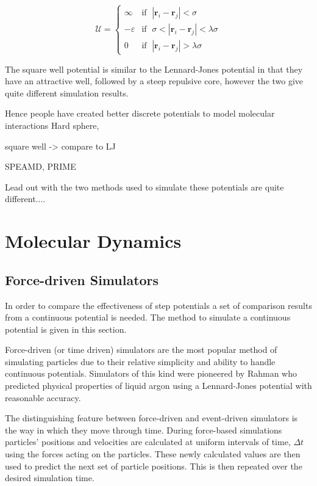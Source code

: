 \documentclass[12pt]{UoAthesis}
\begin{document}
\begin{equation}
  \label{eq:potentialSW}
  \mathcal{U} = 
  \begin{cases}
    \infty &\text{if }\; |\mathbf{r}_i - \mathbf{r}_j| < \sigma \\
    -\varepsilon &\text{if }\; \sigma < |\mathbf{r}_i - \mathbf{r}_j| < \lambda\sigma \\
    0 &\text{if }\; |\mathbf{r}_i - \mathbf{r}_j| > \lambda\sigma
  \end{cases}
\end{equation}

The square well potential is similar to the Lennard-Jones potential in
that they have an attractive well, followed by a steep repulsive core,
however the two give quite different simulation results.  


Hence people have created better discrete potentials to model molecular interactions
 Hard sphere,

square well -> compare to LJ

SPEAMD, PRIME

Lead out with the two methods used to simulate these potentials are quite different....




\chapter{Molecular Dynamics}

\section{Force-driven Simulators} 
In order to compare the effectiveness of step potentials a set of
comparison results from a continuous potential is needed.  The method
to simulate a continuous potential is given in this section.

Force-driven (or time driven) simulators are the most popular method
of simulating particles due to their relative simplicity and ability
to handle continuous potentials. Simulators of this kind were
pioneered by Rahman \cite{Rahman1964} who predicted physical
properties of liquid argon using a Lennard-Jones potential with
reasonable accuracy.

The distinguishing feature between force-driven and event-driven
simulators is the way in which they move through time. During
force-based simulations particles' positions and velocities are
calculated at uniform intervals of time, $\Delta t$ using the forces
acting on the particles. These newly calculated values are then used
to predict the next set of particle positions. This is then repeated
over the desired simulation time.
\end{document}
